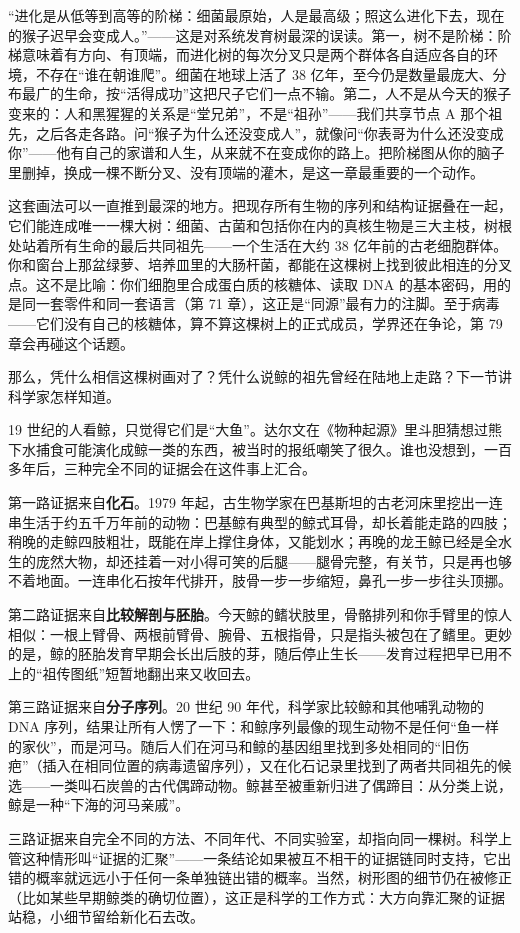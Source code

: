 \begin{wuqu}
“进化是从低等到高等的阶梯：细菌最原始，人是最高级；照这么进化下去，现在的猴子迟早会变成人。”——这是对系统发育树最深的误读。第一，树不是阶梯：阶梯意味着有方向、有顶端，而进化树的每次分叉只是两个群体各自适应各自的环境，不存在“谁在朝谁爬”。细菌在地球上活了 38 亿年，至今仍是数量最庞大、分布最广的生命，按“活得成功”这把尺子它们一点不输。第二，人不是从今天的猴子变来的：人和黑猩猩的关系是“堂兄弟”，不是“祖孙”——我们共享节点 A 那个祖先，之后各走各路。问“猴子为什么还没变成人”，就像问“你表哥为什么还没变成你”——他有自己的家谱和人生，从来就不在变成你的路上。把阶梯图从你的脑子里删掉，换成一棵不断分叉、没有顶端的灌木，是这一章最重要的一个动作。
\end{wuqu}

这套画法可以一直推到最深的地方。把现存所有生物的序列和结构证据叠在一起，它们能连成唯一一棵大树：细菌、古菌和包括你在内的真核生物是三大主枝，树根处站着所有生命的最后共同祖先——一个生活在大约 38 亿年前的古老细胞群体。你和窗台上那盆绿萝、培养皿里的大肠杆菌，都能在这棵树上找到彼此相连的分叉点。这不是比喻：你们细胞里合成蛋白质的核糖体、读取 DNA 的基本密码，用的是同一套零件和同一套语言（第 71 章），这正是“同源”最有力的注脚。至于病毒——它们没有自己的核糖体，算不算这棵树上的正式成员，学界还在争论，第 79 章会再碰这个话题。

那么，凭什么相信这棵树画对了？凭什么说鲸的祖先曾经在陆地上走路？下一节讲科学家怎样知道。

\begin{zhengju}
19 世纪的人看鲸，只觉得它们是“大鱼”。达尔文在《物种起源》里斗胆猜想过熊下水捕食可能演化成鲸一类的东西，被当时的报纸嘲笑了很久。谁也没想到，一百多年后，三种完全不同的证据会在这件事上汇合。

第一路证据来自\textbf{化石}。1979 年起，古生物学家在巴基斯坦的古老河床里挖出一连串生活于约五千万年前的动物：巴基鲸有典型的鲸式耳骨，却长着能走路的四肢；稍晚的走鲸四肢粗壮，既能在岸上撑住身体，又能划水；再晚的龙王鲸已经是全水生的庞然大物，却还挂着一对小得可笑的后腿——腿骨完整，有关节，只是再也够不着地面。一连串化石按年代排开，肢骨一步一步缩短，鼻孔一步一步往头顶挪。

第二路证据来自\textbf{比较解剖与胚胎}。今天鲸的鳍状肢里，骨骼排列和你手臂里的惊人相似：一根上臂骨、两根前臂骨、腕骨、五根指骨，只是指头被包在了鳍里。更妙的是，鲸的胚胎发育早期会长出后肢的芽，随后停止生长——发育过程把早已用不上的“祖传图纸”短暂地翻出来又收回去。

第三路证据来自\textbf{分子序列}。20 世纪 90 年代，科学家比较鲸和其他哺乳动物的 DNA 序列，结果让所有人愣了一下：和鲸序列最像的现生动物不是任何“鱼一样的家伙”，而是河马。随后人们在河马和鲸的基因组里找到多处相同的“旧伤疤”（插入在相同位置的病毒遗留序列），又在化石记录里找到了两者共同祖先的候选——一类叫石炭兽的古代偶蹄动物。鲸甚至被重新归进了偶蹄目：从分类上说，鲸是一种“下海的河马亲戚”。

三路证据来自完全不同的方法、不同年代、不同实验室，却指向同一棵树。科学上管这种情形叫“证据的汇聚”——一条结论如果被互不相干的证据链同时支持，它出错的概率就远远小于任何一条单独链出错的概率。当然，树形图的细节仍在被修正（比如某些早期鲸类的确切位置），这正是科学的工作方式：大方向靠汇聚的证据站稳，小细节留给新化石去改。
\end{zhengju}

